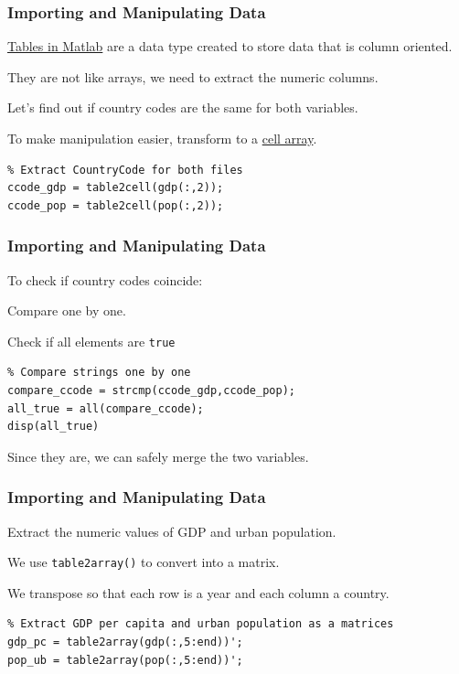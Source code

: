 \documentclass[11pt,xcolor={svgnames},aspectratio=169,usepdftitle=false]{beamer}
\let\toneitemize\itemize
\let\ttwoitemize\enditemize
\renewenvironment{itemize}{\toneitemize\addtolength{\itemsep}{0.7\baselineskip}}{\ttwoitemize}
\let\toneenumer\enumerate
\let\ttwoenumer\endenumerate
\renewenvironment{enumerate}{\toneenumer\addtolength{\itemsep}{0.7\baselineskip}}{\ttwoenumer}
\begin{document}
\begin{frame}[fragile]
  \frametitle{Importing and Manipulating Data}
\begin{itemize}
  \item \href{https://www.mathworks.com/help/matlab/tables.html}{Tables in Matlab} are a data type created to store data that is column oriented.
  \item They are not like arrays, we need to extract the numeric columns.
  \item Let's find out if country codes are the same for both variables.
  \item To make manipulation easier, transform to a \href{https://www.mathworks.com/help/matlab/ref/cell.html}{cell array}.
\end{itemize}
\begin{lstlisting}
% Extract CountryCode for both files
ccode_gdp = table2cell(gdp(:,2));
ccode_pop = table2cell(pop(:,2));
\end{lstlisting}
\end{frame}

\begin{frame}[fragile]
  \frametitle{Importing and Manipulating Data}
  To check if country codes coincide:
  \begin{enumerate}
    \item Compare one by one.
    \item Check if all elements are \verb;true;
  \end{enumerate}
\begin{lstlisting}
% Compare strings one by one
compare_ccode = strcmp(ccode_gdp,ccode_pop);
all_true = all(compare_ccode);
disp(all_true)
\end{lstlisting}
Since they are, we can safely merge the two variables.
\end{frame}

\begin{frame}[fragile]
  \frametitle{Importing and Manipulating Data}
\begin{itemize}
  \item Extract the numeric values of GDP and urban population.
  \item We use \verb;table2array(); to convert into a matrix.
  \item We transpose so that each row is a year and each column a country.
\end{itemize}
\begin{lstlisting}
% Extract GDP per capita and urban population as a matrices
gdp_pc = table2array(gdp(:,5:end))';
pop_ub = table2array(pop(:,5:end))';
\end{lstlisting}
\end{frame}
\end{document}
